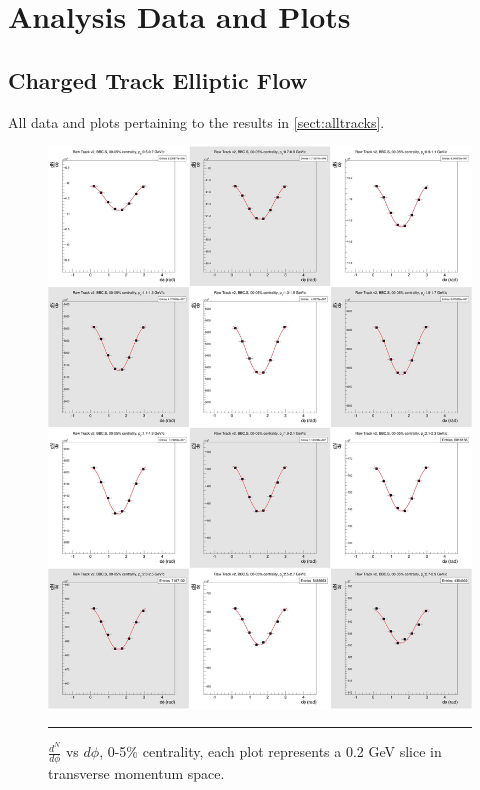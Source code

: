 \chapter{Analysis Data and Plots} %
\label{app:data}
\section{Charged Track Elliptic Flow}
All data and plots pertaining to the results in \ref{sect:alltracks}.

\begin{figure}[htbp!]
  \centering
    \includegraphics[width=1\textwidth]{chargedtrackv2/htrkdphi2bbcs_0.jpg}
    \rule{35em}{0.5pt}
  \caption[$\frac{dN}{d\phi}$ vs $d\phi$, 0-5\% centrality.]{$\frac{d^N}{d\phi}$ vs $d\phi$, 0-5\% centrality, each plot represents a 0.2 GeV slice in transverse momentum space.}
  \label{fig:Ndphicent0}
\end{figure}

